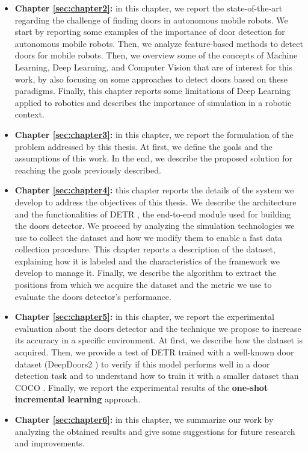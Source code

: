 \begin{itemize}
	\item \textbf{Chapter \ref{sec:chapter2}:} in this chapter, we report the state-of-the-art regarding the challenge of finding doors in autonomous mobile robots. We start by reporting some examples of the importance of door detection for autonomous mobile robots. Then, we analyze feature-based methods to detect doors for mobile robots. Then, we overview some of the concepts of Machine Learning, Deep Learning, and Computer Vision that are of interest for this work, by also focusing on some approaches to detect doors based on these paradigms. Finally, this chapter reports some limitations of Deep Learning applied to robotics and describes the importance of simulation in a robotic context.
	
	\item \textbf{Chapter \ref{sec:chapter3}:} in this chapter, we report the formulation of the problem addressed by this thesis. At first, we define the goals and the assumptions of this work. In the end, we describe the proposed solution for reaching the goals previously described.
	
	\item \textbf{Chapter \ref{sec:chapter4}:} this chapter reports the details of the system we develop to address the objectives of this thesis. We describe the architecture and the functionalities of DETR \cite{detr}, the end-to-end module used for building the doors detector. We proceed by analyzing the simulation technologies we use to collect the dataset and how we modify them to enable a fast data collection procedure. This chapter reports a description of the dataset, explaining how it is labeled and the characteristics of the framework we develop to manage it. Finally, we describe the algorithm to extract the positions from which we acquire the dataset and the metric we use to evaluate the doors detector's performance.
	
	\item \textbf{Chapter \ref{sec:chapter5}:} in this chapter, we report the experimental evaluation about the doors detector and the technique we propose to increase its accuracy in a specific environment. At first, we describe how  the dataset is acquired. Then, we provide a test of DETR trained with a well-known door dataset (DeepDoors2 \cite{deepdoors2}) to verify if this model performs well in a door detection task and to understand how to train it with a smaller dataset than COCO \cite{coco}. Finally, we report the experimental results of the \textbf{one-shot incremental learning} approach.
	
	\item \textbf{Chapter \ref{sec:chapter6}:} in this chapter, we summarize our work by analyzing the obtained results and give some suggestions for future research and improvements.
\end{itemize}
